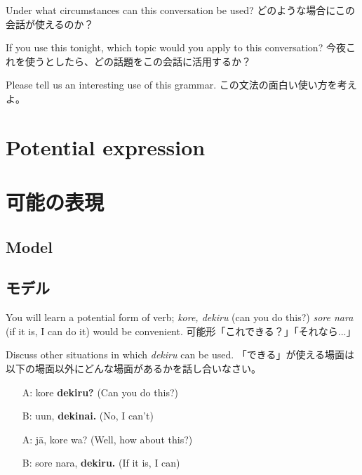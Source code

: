 \documentclass[uplatex,dvipdfmx,b5paper,english,10pt]{jsbook}
\begin{document}
\begin{toiquestion}
\ifEnglish
Under what circumstances can this conversation be used?
\else
どのような場合にこの会話が使えるのか？
\fi
\end{toiquestion}

\begin{toiquestion}
\ifEnglish
If you use this tonight, which topic would you apply to this conversation?
\else
今夜これを使うとしたら、どの話題をこの会話に活用するか？
\fi
\end{toiquestion}

\begin{toiquestion}
\ifEnglish
Please tell us an interesting use of this grammar.
\else
この文法の面白い使い方を考えよ。
\fi
\end{toiquestion}



%

\ifEnglish
\section{Potential expression}
\else
\section{可能の表現}
\fi


\ifEnglish
\subsection{Model}
\else
\subsection{モデル}
\fi

\ifEnglish
You will learn a potential form of verb; {\it kore, dekiru\/} (can you do this?)
{\it sore nara\/} (if it is, I can do it)  would be convenient.
\else
可能形「これできる？」「それなら...」
\fi

\begin{toiquestion}
\ifEnglish
Discuss other situations in which {\it dekiru\/} can be used.
\else
「できる」が使える場面は以下の場面以外にどんな場面があるかを話し合いなさい。
\fi
\end{toiquestion}


\begin{itemize}
 \item[A:] kore {\bfseries dekiru?} (Can you do this?)
 \item[B:] uun, {\bfseries dekinai.} (No, I can't)
 \item[A:] j\=a, kore wa? (Well, how about this?)
 \item[B:] sore nara, {\bfseries dekiru.} (If it is, I can)
\end{itemize}
\end{document}
